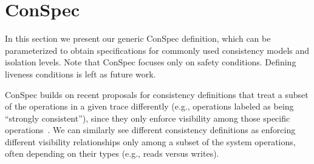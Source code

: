 \documentclass[acmlarge, ,11pt]{acmart}
\begin{document}
 \section{ConSpec}\label{sec:syntax}
In this section we present our generic ConSpec definition, which can be parameterized to obtain specifications for commonly used consistency models and
  isolation levels. Note that ConSpec focuses only on safety conditions. Defining liveness conditions is left as future work.

ConSpec builds on recent proposals for consistency definitions that treat a subset of the operations in a given trace differently (e.g., operations labeled as being ``strongly consistent''), since they only enforce visibility among those specific operations~\cite{Li:2012:MGS:2387880.2387906, Gotsman:2016:CIS:2837614.2837625, cheng-papoc}. We can similarly see different consistency definitions as enforcing different visibility relationships only among a subset of the system operations, often depending on their types (e.g., reads versus writes).
\end{document}
